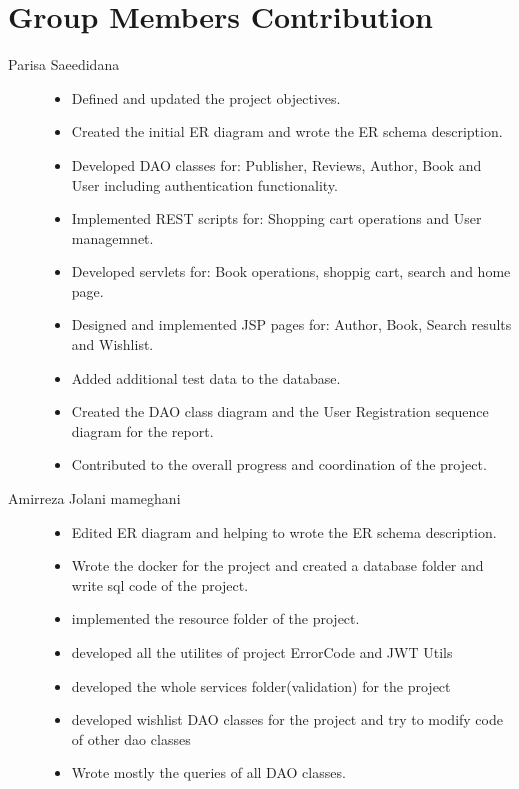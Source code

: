 \section{Group Members Contribution}


\begin{description}
	\item[Parisa Saeedidana]
	    \begin{itemize}
		\item Defined and updated the project objectives.
		\item Created the initial ER diagram and wrote the ER schema description.
		\item Developed DAO classes for: Publisher, Reviews, Author, Book and User including authentication functionality.
		\item Implemented REST scripts for: Shopping cart operations and User managemnet.
		\item Developed servlets for: Book operations, shoppig cart, search and home page.
		\item Designed and implemented JSP pages for: Author, Book, Search results and Wishlist.
		\item Added additional test data to the database.
		\item Created the DAO class diagram and the User Registration sequence diagram for the report.
		\item Contributed to the overall progress and coordination of the project.
		\end{itemize}
	\item[Amirreza Jolani mameghani] 	    
	\begin{itemize}
		\item Edited ER diagram and helping to wrote the ER schema description.
		\item Wrote the docker for the project and created a database folder and write sql code of the project.
		\item implemented the resource folder of the project.
		\item developed all the utilites of project ErrorCode and JWT Utils
		\item developed the whole services folder(validation) for the project
		\item developed wishlist DAO classes for the project and try to modify code of other dao classes
		\item Wrote mostly the queries of all DAO classes.

\end{itemize}
\end{description}
